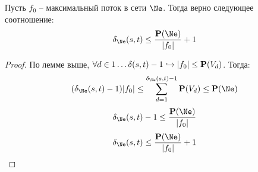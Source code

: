 \Lm Пусть $f_0$ -- максимальный поток в сети $\Ne$. Тогда верно следующее соотношение:
\begin{equation*}
    \delta_{\Ne}(s, t) \leq \frac{\P(\Ne)}{|f_0|} + 1
\end{equation*}
\begin{proof}
    
    По лемме выше, $\forall d \in 1 \dots \delta(s, t) - 1 \hookrightarrow |f_0| \leq \P(V_d)$. Тогда:
    \begin{equation*}
        (\delta_\Ne(s, t) - 1) |f_0| \leq \sum\limits_{d = 1}^{\delta_\Ne(s, t) - 1} \P (V_d) \leq \P(\Ne)
    \end{equation*}
    \begin{equation*}
        \delta_\Ne(s, t) - 1 \leq \frac{\P(\Ne)}{|f_0|}
    \end{equation*}
    \begin{equation*}
        \delta_\Ne(s, t) \leq \frac{\P(\Ne)}{|f_0|} + 1
    \end{equation*}

\end{proof}

